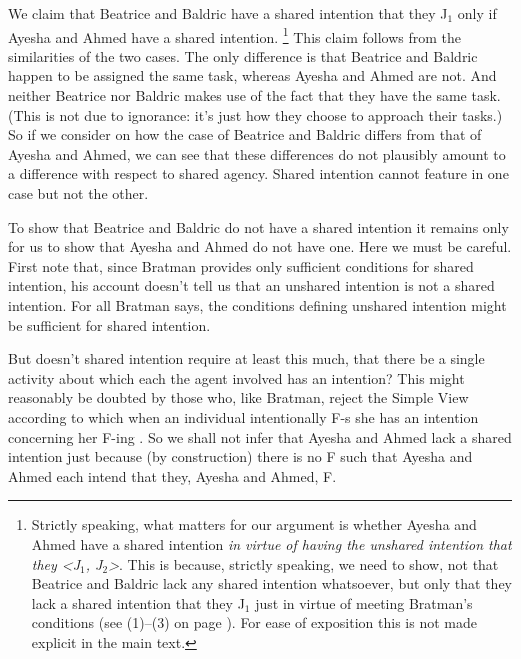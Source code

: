 \documentclass[12pt,\papersize]{extarticle}
\begin{document}
We claim that Beatrice and Baldric have a shared intention that they J$_1$
only if 
Ayesha and Ahmed have a shared intention.%
\footnote{
Strictly speaking, 
	what matters for our argument is whether Ayesha and Ahmed have a shared intention \emph{in virtue of having the unshared intention that they <J$_1$, J$_2$>}.
	This is because, strictly speaking, we need to show, not that Beatrice and Baldric lack any shared intention whatsoever, but only that they lack a shared intention that they J$_1$ just in virtue of meeting Bratman's conditions (see (1)--(3) on page  \pageref{quote:bratman_account}). 
	For ease of exposition this is not made explicit in the main text.
} 
This claim follows from the similarities of the two cases.
The only difference is that Beatrice and Baldric happen to be assigned the same task, whereas Ayesha and Ahmed are not.
And neither Beatrice nor Baldric makes use of the fact that they have the same task. 
(This is not due to ignorance: it's just how they choose to approach their tasks.)
So if we consider on how  
		the case of Beatrice and Baldric
	differs from
		 that of Ayesha and Ahmed,
we can see that these differences do not plausibly amount to a difference with respect to shared agency.
Shared intention cannot feature in one case but not the other.

To show that Beatrice and Baldric do not have a shared intention it remains only for us to show that Ayesha and Ahmed do not have one. 
Here we must be careful.
First note that,
	 since Bratman provides only sufficient conditions for shared intention, 
	 his account doesn't tell us that an unshared intention is not a shared intention.
For all Bratman says, the conditions defining unshared intention might  be sufficient for shared intention. 

But doesn't shared intention require at least this much,
that there be a single activity  about which each the agent involved has an intention? 
This might reasonably be doubted by those who, like Bratman, reject the Simple View according to which when an individual intentionally F-s she has an intention concerning her F-ing \citep{Bratman:1984jr}.
So 
	we shall not infer  that Ayesha and Ahmed lack a shared intention
	just because (by construction) there is no F such that Ayesha and Ahmed each intend that they, Ayesha and Ahmed, F.
\end{document}
